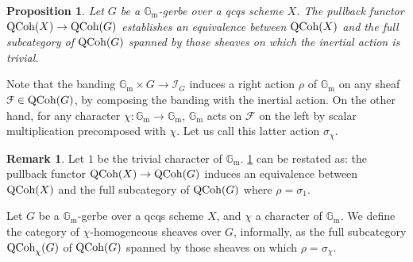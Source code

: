 \documentclass[11pt, twoside]{article} %
\numberwithin{equation}{section}
\theoremstyle{plain}
\newtheorem{prop}[thm]{Proposition}
\theoremstyle{definition}
\newtheorem{rem}[thm]{Remark}
\newcommand{\Gm}{\mathbb G_{\mathrm{m}}}
\newcommand{\QCoh}{\textup{QCoh}}
\newcommand{\cF}{{\mathcal F}}
\newcommand{\cI}{\mathcal I}
\begin{document}
	\begin{prop}\label{zero-homogeneous}
		Let $G$ be a $\Gm$-gerbe over a qcqs scheme $X$. The pullback functor $\QCoh(X)\to \QCoh(G)$ establishes an equivalence between $\QCoh(X)$ and the full subcategory of $\QCoh(G)$ spanned by those sheaves on which the inertial action is trivial.
	\end{prop}
	
	Note that the banding $\Gm \times G\to \cI_{G}$ induces a right action $\rho$ of $\Gm$ on any sheaf $\cF\in \QCoh(G)$, by composing the banding with the inertial action. On the other hand, for any character $\chi:\Gm\to \Gm$, $\Gm$ acts on $\cF$ on the left by scalar multiplication precomposed with $\chi$. Let us call this latter action $\sigma_\chi$.
	\begin{rem}Let $1$ be the trivial character of $\Gm$. \cref{zero-homogeneous} can be restated as: the pullback functor $\QCoh(X)\to \QCoh(G)$ induces an equivalence between $\QCoh(X)$ and the full subcategory of $\QCoh(G)$ where $\rho=\sigma_1$.
	\end{rem}
	
Let $G$ be a $\Gm$-gerbe over a qcqs scheme $X$, and $\chi$ a character of $\Gm$. We define the category of $\chi$-homogeneous sheaves over $G$, informally, as the full subcategory $\QCoh_\chi(G)$ of $\QCoh(G)$ spanned by those sheaves on which $\rho=\sigma_\chi$.
		
\end{document}
